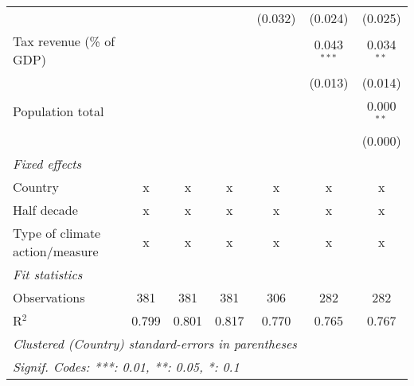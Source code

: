 \begin{tabular}{lcccccc}
                                                         &             &         &                & (0.032)        & (0.024)        & (0.025)\\   
   Tax revenue (\% of GDP)                               &             &         &                &                & 0.043$^{***}$  & 0.034$^{**}$\\   
                                                         &             &         &                &                & (0.013)        & (0.014)\\   
   Population total                                      &             &         &                &                &                & 0.000$^{**}$\\   
                                                         &             &         &                &                &                & (0.000)\\   
   \emph{Fixed effects}\\
   Country                                               & x           & x       & x              & x              & x              & x\\  
   Half decade                                           & x           & x       & x              & x              & x              & x\\  
   Type of climate action/measure                        & x           & x       & x              & x              & x              & x\\  
   \midrule \emph{Fit statistics}\\
   Observations                                          & 381         & 381     & 381            & 306            & 282            & 282\\  
   R$^2$                                                 & 0.799       & 0.801   & 0.817          & 0.770          & 0.765          & 0.767\\  
   \midrule
   \multicolumn{7}{l}{\emph{Clustered (Country) standard-errors in parentheses}}\\
   \multicolumn{7}{l}{\emph{Signif. Codes: ***: 0.01, **: 0.05, *: 0.1}}\\
\end{tabular}
\par\endgroup


